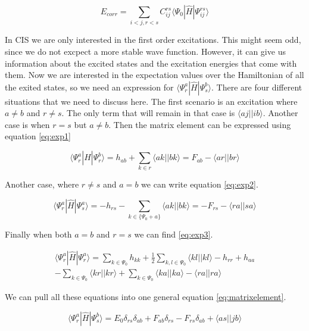 \documentclass[twoside,twocolumn,9pt]{article}
\begin{document}
\begin{equation}\label{eq:doubles}
  E_{corr} = \sum_{i<j, r<s} C_{ij}^{rs}\langle \Psi_{0} |\hat{H}|\Psi_{ij}^{rs}\rangle
\end{equation}

In CIS we are only interested in the first order excitations. This might seem odd, since we do not excpect a more stable wave function. However, it can give us information about the
excited states and the excitation energies that come with them. Now we are interested in the expectation values over the Hamiltonian of all the exited states, so we need an expression
for $\langle \Psi_r^a |\hat{H}| \Psi_s^b \rangle$. There are four different situations that we need to discuss here\cite{Sherrill1996}. The first scenario is an excitation where
$a \neq b$ and $r \neq s$. The only term that will remain in that case is $\langle aj || ib \rangle$. Another case is when $r = s$ but $a \neq b$. Then the matrix element can be
expressed using equation \eqref{eq:exp1}

\begin{equation}\label{eq:exp1}
  \langle \Psi_r^a|\hat{H}|\Psi^b_r \rangle = h_{ab} + \sum_{k\in r} \langle ak || bk \rangle = F_{ab} - \langle ar||br \rangle
\end{equation}

Another case, where $r \neq s$ and $a = b$ we can write equation \eqref{eq:exp2}.

\begin{equation}\label{eq:exp2}
  \langle \Psi_r^a|\hat{H}|\Psi^a_s \rangle = -h_{rs} - \sum_{k \in \{\Psi_0 + a\}} \langle ak || bk \rangle = -F_{rs} - \langle ra || sa \rangle
\end{equation}

Finally when both $a = b$ and $r = s$ we can find \eqref{eq:exp3}.

\begin{multline}\label{eq:exp3}
  \langle \Psi^a_r|\hat{H}|\Psi^a_r \rangle = \sum_{k \in \Psi_0}h_{kk} + \frac{1}{2}\sum_{k,l \in \Psi_0} \langle kl||kl \rangle - h_{rr} + h_{aa} \\ - \sum_{k \in \Psi_0} \langle
  kr || kr \rangle + \sum_{k \in \Psi_0} \langle ka||ka \rangle - \langle ra||ra \rangle
\end{multline}

We can pull all these equations into one general equation \eqref{eq:matrixelement}.

\begin{equation}\label{eq:matrixelement}
  \langle \Psi_r^a|\hat{H}|\Psi_s^b \rangle = E_0\delta_{rs}\delta_{ab} + F_{ab}\delta_{rs} - F_{rs}\delta_{ab} + \langle as || jb \rangle
\end{equation}
\end{document}
